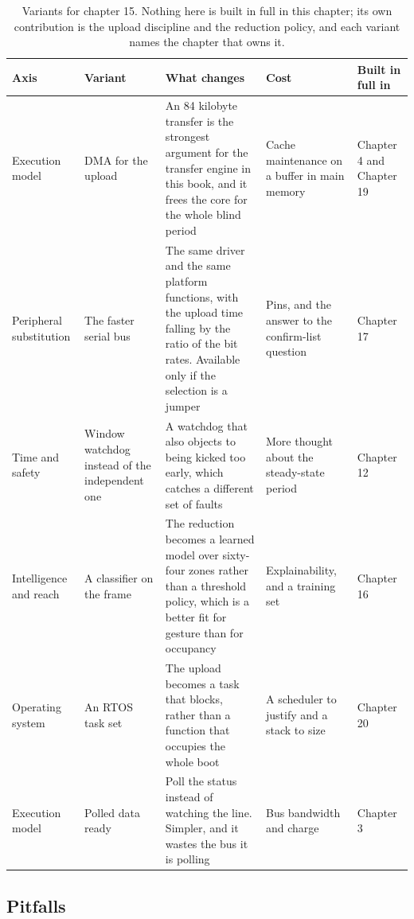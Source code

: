 \begin{table}[H]\centering\small
\begin{tabular}{p{24mm}p{26mm}p{44mm}p{22mm}p{20mm}}
\toprule
Axis & Variant & What changes & Cost & Built in full in \\
\midrule
Execution model & DMA for the upload & An 84 kilobyte transfer is the strongest argument for the transfer engine in this book, and it frees the core for the whole blind period & Cache maintenance on a buffer in main memory & Chapter 4 and Chapter 19 \\
Peripheral substitution & The faster serial bus & The same driver and the same platform functions, with the upload time falling by the ratio of the bit rates. Available only if the selection is a jumper & Pins, and the answer to the confirm-list question & Chapter 17 \\
Time and safety & Window watchdog instead of the independent one & A watchdog that also objects to being kicked too early, which catches a different set of faults & More thought about the steady-state period & Chapter 12 \\
Intelligence and reach & A classifier on the frame & The reduction becomes a learned model over sixty-four zones rather than a threshold policy, which is a better fit for gesture than for occupancy & Explainability, and a training set & Chapter 16 \\
Operating system & An RTOS task set & The upload becomes a task that blocks, rather than a function that occupies the whole boot & A scheduler to justify and a stack to size & Chapter 20 \\
Execution model & Polled data ready & Poll the status instead of watching the line. Simpler, and it wastes the bus it is polling & Bus bandwidth and charge & Chapter 3 \\
\bottomrule
\end{tabular}
\caption{Variants for chapter 15. Nothing here is built in full in this chapter; its own contribution is the upload discipline and the reduction policy, and each variant names the chapter that owns it.}
\end{table}

\subsection*{Pitfalls}

